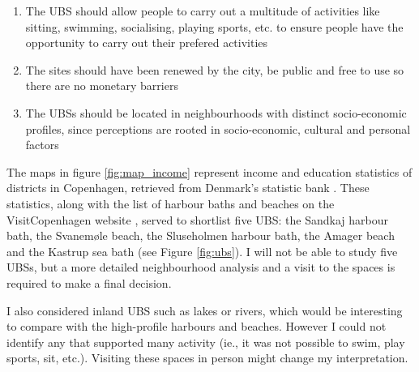 \documentclass{article}
\begin{document}
\begin{enumerate}
	\item The UBS should allow people to carry out a multitude of activities like sitting, swimming, socialising, playing sports, etc. to ensure people have the opportunity to carry out their prefered activities
	\item The sites should have been renewed by the city, be public and free to use so there are no monetary barriers
	\item The UBSs should be located in neighbourhoods with distinct socio-economic profiles, since perceptions are rooted in socio-economic, cultural and personal factors
\end{enumerate}

The maps in figure \ref{fig:map_income} represent income and education statistics of districts in Copenhagen, retrieved from Denmark's statistic bank \parencite{copenhagenStatbank}. These statistics, along with the list of harbour baths and beaches on the VisitCopenhagen website \parencite{visitcopenhagen_baths}, served to shortlist five UBS: the Sandkaj harbour bath, the Svanemøle beach, the Sluseholmen harbour bath, the Amager beach and the Kastrup sea bath (see Figure \ref{fig:ubs}). I will not be able to study five UBSs, but a more detailed neighbourhood analysis and a visit to the spaces is required to make a final decision. 

I also considered inland UBS such as lakes or rivers, which would be interesting to compare with the high-profile harbours and beaches. However I could not identify any that supported many activity (ie., it was not possible to swim, play sports, sit, etc.). Visiting these spaces in person might change my interpretation.
\end{document}
